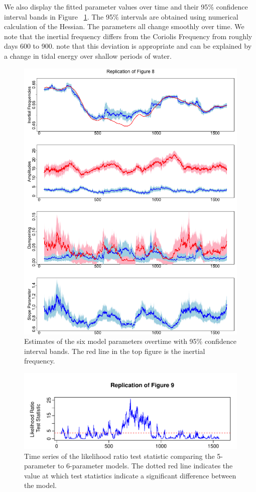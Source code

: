 \documentclass{stat572Style}
\begin{document}
   
 \par
 We also display the fitted parameter values over time and their 95$\%$ confidence interval bands in Figure ~\ref{fig: fig8}. 
The 95$\%$ intervals are obtained using numerical calculation of the Hessian.
The parameters all change smoothly over time. 
We note that the inertial frequency differs from the Coriolis Frequency from roughly days 600 to 900. 
\citet{Sykulski2016} note that this deviation is appropriate and can be explained by a change in tidal energy over shallow periods of water. 
 \begin{figure}[h!]
  \centering
    \includegraphics[width=.8\textwidth]{ReplicatedFigures/fig8.png}
        \caption{Estimates of the six model parameters overtime with 95$\%$ confidence interval bands. The red line in the top figure is the inertial frequency.}
        	\label{fig: fig8}
\end{figure}

 \begin{figure}[h!]
  \centering
    \includegraphics[width=.85\textwidth]{ReplicatedFigures/fig9.pdf}
        \caption{Time series of the likelihood ratio test statistic comparing the 5-parameter to 6-parameter models. The dotted red line indicates the value at which test statistics indicate a significant difference between the model. }
        	\label{fig: fig9}
\end{figure}
\end{document}
